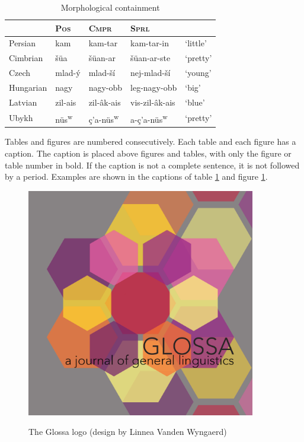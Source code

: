 \documentclass[charis,linguex,biblatex]{glossa}
\begin{document}
\begin{table}[h]
\sffamily
\centering
\caption{Morphological containment}	
\begin{tabular}{lllll}
 & \textsc{Pos} & \textsc{Cmpr} & \textsc{Sprl}\\
\hline 
Persian & kam & kam-tar & kam-tar-in & ‘little’\\
Cimbrian & šüa & šüan-ar & šüan-ar-ste & ‘pretty’ \\
Czech & mlad-ý & mlad-ší & nej-mlad-ší & ‘young’\\
Hungarian & nagy & nagy-obb & leg-nagy-obb & ‘big’\\
Latvian & zil-ais & zil-âk-ais & vis-zil-âk-ais & ‘blue’\\
Ubykh &  nüs\textsuperscript{w}\textipa{@} & ç’a-nüs\textsuperscript{w}\textipa{@} & a-ç’a-nüs\textsuperscript{w}\textipa{@} & ‘pretty’ \\
\end{tabular}\label{tbl:table1}
\end{table}

Tables and figures are numbered consecutively. Each table and each figure has a caption. The caption is placed above figures and tables, with only the figure or table number in bold.  If the caption is not a complete sentence, it is not followed by a period. Examples are shown in the captions of table \ref{tbl:table1} and figure \ref{fig:glossalogo}. 

\begin{figure}[h]
\centering
\caption{The Glossa logo (design by Linnea Vanden Wyngaerd)}
\includegraphics[width=10cm]{glossa}
\label{fig:glossalogo}
\end{figure}
\end{document}
